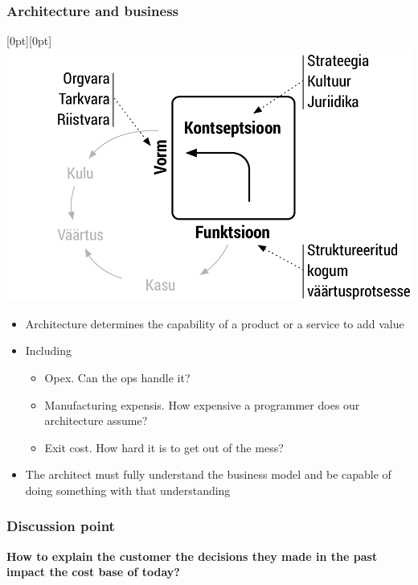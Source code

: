 \begin{frame}[fragile]
  \frametitle{Architecture and business}
  \newcommand{\lenitem}[2][.55\linewidth]{\parbox[t]{#1}{\strut #2\strut}}
  
  \mbox{}\hfill\raisebox{-\height}[0pt][0pt]{\includegraphics[width=.4\linewidth]{ffc_profit.pdf}}
  \vspace*{-\baselineskip}
  
			\begin{itemize}
				\item \lenitem{Architecture determines the capability of a product or a service to add value}
				\item Including
				\begin{itemize}
					\item \lenitem{Opex. Can the ops handle it?}
					\item \lenitem{Manufacturing expensis. How expensive a programmer does our architecture assume?}
					\item Exit cost. How hard it is to get out of the mess?
				\end{itemize}
				\item The architect must fully understand the business model and be capable of doing something with that understanding
			\end{itemize}
\end{frame}

\begin{frame}
  \frametitle{Discussion point}
		\begin{center}
			\textbf{How to explain the customer the decisions they made in the past impact the cost base of today?}
		\end{center}
\end{frame}

